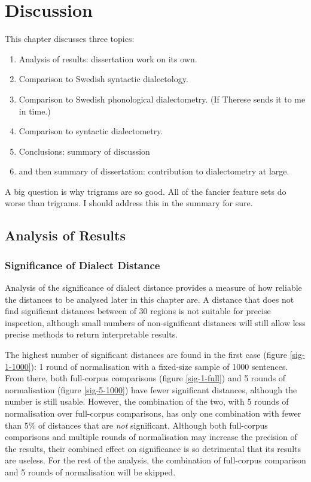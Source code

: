 \chapter{Discussion}

This chapter discusses three topics:

\begin{enumerate}
\item Analysis of results: dissertation work on its own.
\item Comparison to Swedish syntactic dialectology.
\item Comparison to Swedish phonological dialectometry. (If Therese
  sends it to me in time.)
\item Comparison to syntactic dialectometry.
\item Conclusions: summary of discussion
\item and then summary of dissertation: contribution to dialectometry at large.
\end{enumerate}

A big question is why trigrams are so good. All of the fancier feature
sets do worse than trigrams. I should address this in the summary for
sure.

\section{Analysis of Results}


\subsection{Significance of Dialect Distance}

Analysis of the significance of dialect distance provides a measure of
how reliable the distances to be analysed later in this chapter are. A
distance that does not find significant distances between of 30
regions is not suitable for precise inspection, although small numbers
of non-significant distances will still allow less precise methods to
return interpretable results.

The highest number of significant distances are found in the first
case (figure \ref{sig-1-1000}): 1 round of normalisation with a
fixed-size sample of 1000 sentences. From there, both full-corpus
comparisons (figure \ref{sig-1-full}) and 5 rounds of normalisation
(figure \ref{sig-5-1000}) have fewer significant distances, although
the number is still usable. However, the combination of the two, with
5 rounds of normalisation over full-corpus comparisons, has only one
combination with fewer than 5\% of distances that are {\it not}
significant. Although both full-corpus comparisons and multiple rounds
of normalisation may increase the precision of the results, their
combined effect on significance is so detrimental that its results are
useless. For the rest of the analysis, the combination of full-corpus
comparison and 5 rounds of normalisation will be skipped.

